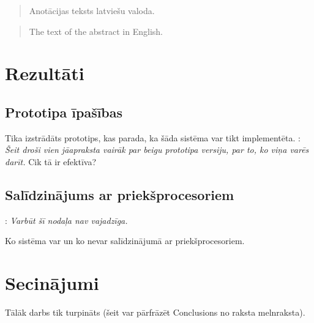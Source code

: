 \documentclass[12pt]{report}
\newcommand{\fixme}[1]{\vskip 5mm\noindent{\bf FIXME}: {\it #1}}
\begin{document}
\titullapa

        \begin{abstract}
        Anotācijas teksts latviešu valoda.
        \end{abstract}
        \begin{abstract}
        The text of the abstract in English.
        \end{abstract}













\section{Rezultāti}
\subsection{Prototipa īpašības}
Tika izstrādāts prototips, kas parada, ka šāda sistēma var tikt implementēta.
\fixme{Šeit droši vien jāapraksta vairāk par beigu prototipa versiju, par to, ko viņa varēs darīt.} Cik tā ir efektīva?
\subsection{Salīdzinājums ar priekšprocesoriem}
\fixme{Varbūt šī nodaļa nav vajadzīga.}

Ko sistēma var un ko nevar salīdzinājumā ar priekšprocesoriem.

\section{Secinājumi}
Tālāk darbs tik turpināts (šeit var pārfrāzēt Conclusions no raksta melnraksta).



{}

\end{document}
